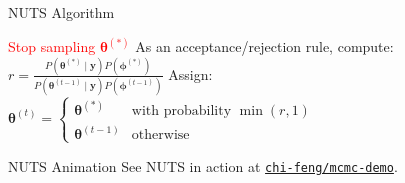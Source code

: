 \begin{frame}{NUTS Algorithm}
\begin{algorithm}[H]
{{{				}{
					\textcolor{red}{Stop sampling $\boldsymbol{\theta}^{(*)}$\;
					}
				}
			}
		}
		As an acceptance/rejection rule, compute:
		$r = \frac{P \left(\boldsymbol{\theta}^{(*)} \mid \mathbf{y} \right) P \left(\boldsymbol{\phi}^{(*)} \right)}{P \left(\boldsymbol{\theta}^{(t-1)} \mid \mathbf{y} \right) P \left(\boldsymbol{\phi}^{(t-1)} \right)}$\;
		Assign:
		$
			\boldsymbol{\theta}^{(t)} =
			\begin{cases}
				\boldsymbol{\theta}^{(*)}   & \text{with probability $\min(r,1)$} \\
				\boldsymbol{\theta}^{(t-1)} & \text{otherwise}
			\end{cases}
		$\;
		\caption{No-U-Turn-Sampler (NUTS)}
	\end{algorithm}
\end{frame}


\begin{frame}{NUTS Animation}
	See NUTS in action at \href{https://chi-feng.github.io/mcmc-demo/app.html?algorithm=EfficientNUTS&target=banana}{\texttt{chi-feng/mcmc-demo}}.
\end{frame}

